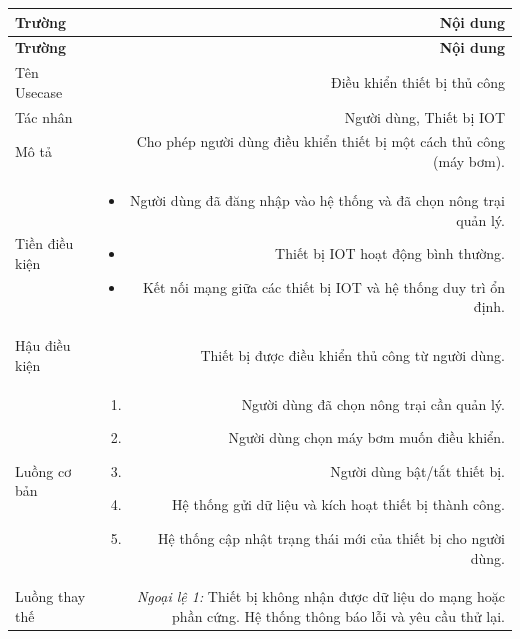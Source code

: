 \begin{longtable}{|L|R|}
 
\hline
\textbf{Trường} & \textbf{Nội dung} \\ \hline
 
\endfirsthead
 
\hline
\textbf{Trường} & \textbf{Nội dung} \\ \hline
 
\endhead
 
\endfoot
 
Tên Usecase & Điều khiển thiết bị thủ công \\[4pt] \hline
 
Tác nhân & Người dùng, Thiết bị IOT \\[4pt] \hline
 
Mô tả & Cho phép người dùng điều khiển thiết bị một cách thủ công (máy bơm). \\[4pt] \hline
 
Tiền điều kiện &
\begin{itemize}[leftmargin=*, nosep, topsep=2pt]
  \item Người dùng đã đăng nhập vào hệ thống và đã chọn nông trại quản lý.
  \item Thiết bị IOT hoạt động bình thường.
  \item Kết nối mạng giữa các thiết bị IOT và hệ thống duy trì ổn định.
\end{itemize} \\[4pt] \hline
 
Hậu điều kiện & Thiết bị được điều khiển thủ công từ người dùng. \\[4pt] \hline
 
Luồng cơ bản &
\begin{enumerate}[leftmargin=*, nosep, topsep=2pt]
  \item Người dùng đã chọn nông trại cần quản lý.
  \item Người dùng chọn máy bơm muốn điều khiển.
  \item Người dùng bật/tắt thiết bị.
  \item Hệ thống gửi dữ liệu và kích hoạt thiết bị thành công.
  \item Hệ thống cập nhật trạng thái mới của thiết bị cho người dùng.
\end{enumerate} \\[4pt] \hline
 
Luồng thay thế &
\textit{Ngoại lệ 1:} Thiết bị không nhận được dữ liệu do mạng hoặc phần cứng.
Hệ thống thông báo lỗi và yêu cầu thử lại. \\[4pt] \hline
 
\end{longtable}
 
